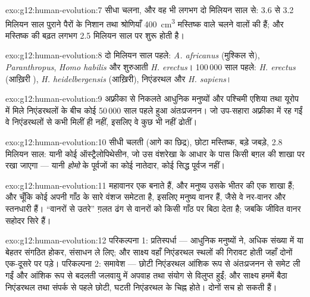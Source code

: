 \begin{solution}{exo:g12:human-evolution:7}
सीधा चलना, और वह भी लगभग दो मिलियन साल से: 3.6 से 3.2 मिलियन साल पुराने
पैरों के निशान तथा श्रोणियाँ \qty{400}{cm^3} मस्तिष्क वाले चलने वालों की
हैं; और मस्तिष्क की बढ़त लगभग 2.5 मिलियन साल पर शुरू होती है।
\end{solution}

\begin{solution}{exo:g12:human-evolution:8}
दो मिलियन साल पहले: \emph{A. africanus} (मुश्किल से), \emph{Paranthropus},
\emph{Homo habilis} और शुरुआती \emph{H. erectus}। 100\,000 साल पहले:
\emph{H. erectus} (आख़िरी ), \emph{H. heidelbergensis} (आख़िरी),
निएंडरथल और \emph{H. sapiens}।
\end{solution}

\begin{solution}{exo:g12:human-evolution:9}
अफ़्रीका से निकलते आधुनिक मनुष्यों और पश्चिमी एशिया तथा यूरोप में मिले
निएंडरथलों के बीच कोई 50\,000 साल पहले हुआ अंतःप्रजनन। जो 
उप-सहारा अफ़्रीका में रह गईं वे निएंडरथलों से कभी मिलीं ही नहीं, इसलिए वे
कुछ भी नहीं ढोतीं।
\end{solution}

\begin{solution}{exo:g12:human-evolution:10}
सीधी चलती (आगे का छिद्र), छोटा मस्तिष्क, बड़े जबड़े, 2.8 मिलियन साल: यानी
कोई ऑस्ट्रैलोपिथेसीन, जो उस वंशरेखा के आधार के पास किसी बग़ल की शाखा पर
रखा जाएगा --- यानी \emph{होमो} के पूर्वजों का कोई नातेदार, कोई सिद्ध
पूर्वज नहीं।
\end{solution}

\begin{solution}{exo:g12:human-evolution:11}
महावानर एक  बनाते हैं, और मनुष्य उसके भीतर की एक शाखा हैं; और चूँकि
कोई  अपनी गाँठ के सारे वंशज समेटता है, इसलिए मनुष्य वानर हैं, जैसे वे
नर-वानर और स्तनधारी हैं। ``वानरों से उतरे'' ग़लत ढंग से वानरों को किसी गाँठ
पर बिठा देता है; जबकि जीवित वानर सहोदर सिरे हैं।
\end{solution}

\begin{solution}{exo:g12:human-evolution:12}
परिकल्पना 1: प्रतिस्पर्धा --- आधुनिक मनुष्यों ने, अधिक संख्या में या बेहतर
संगठित होकर, संसाधन ले लिए; और साक्ष्य वहाँ निएंडरथल स्थलों की गिरावट होती
जहाँ दोनों एक-दूसरे पर पड़े। परिकल्पना 2: समावेश --- छोटी निएंडरथल 
आंशिक रूप से अंतःप्रजनन से समेट ली गईं और आंशिक रूप से बदलती जलवायु में
अपवाह तथा संयोग से विलुप्त हुईं; और साक्ष्य हममें बैठा निएंडरथल  तथा
संपर्क से पहले छोटी, घटती निएंडरथल  के चिह्न होते। दोनों सच हो सकती
हैं।
\end{solution}

